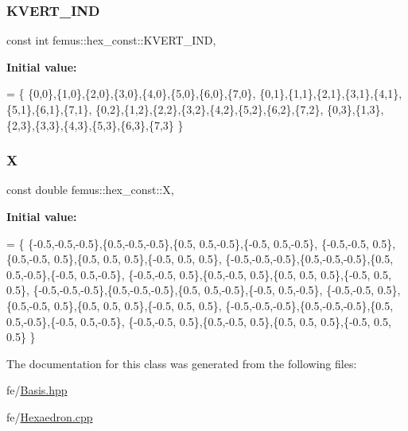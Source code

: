 \subsubsection{\texorpdfstring{K\+V\+E\+R\+T\+\_\+\+I\+ND}{KVERT\_IND}}
{\footnotesize\ttfamily const int femus\+::hex\+\_\+const\+::\+K\+V\+E\+R\+T\+\_\+\+I\+ND\hspace{0.3cm}{\ttfamily [static]}, {\ttfamily [protected]}}

{\bfseries Initial value\+:}
\begin{DoxyCode}
= \{
    \{0,0\},\{1,0\},\{2,0\},\{3,0\},\{4,0\},\{5,0\},\{6,0\},\{7,0\},
    \{0,1\},\{1,1\},\{2,1\},\{3,1\},\{4,1\},\{5,1\},\{6,1\},\{7,1\},
    \{0,2\},\{1,2\},\{2,2\},\{3,2\},\{4,2\},\{5,2\},\{6,2\},\{7,2\},
    \{0,3\},\{1,3\},\{2,3\},\{3,3\},\{4,3\},\{5,3\},\{6,3\},\{7,3\}
  \}
\end{DoxyCode}
\mbox{\label{classfemus_1_1hex__const_a5c73e5bd6411607a040bca49d6b6cb94}} 
\subsubsection{\texorpdfstring{X}{X}}
{\footnotesize\ttfamily const double femus\+::hex\+\_\+const\+::X\hspace{0.3cm}{\ttfamily [static]}, {\ttfamily [protected]}}

{\bfseries Initial value\+:}
\begin{DoxyCode}
= \{
    \{-0.5,-0.5,-0.5\},\{0.5,-0.5,-0.5\},\{0.5, 0.5,-0.5\},\{-0.5, 0.5,-0.5\},
    \{-0.5,-0.5, 0.5\},\{0.5,-0.5, 0.5\},\{0.5, 0.5, 0.5\},\{-0.5, 0.5, 0.5\},
    \{-0.5,-0.5,-0.5\},\{0.5,-0.5,-0.5\},\{0.5, 0.5,-0.5\},\{-0.5, 0.5,-0.5\},
    \{-0.5,-0.5, 0.5\},\{0.5,-0.5, 0.5\},\{0.5, 0.5, 0.5\},\{-0.5, 0.5, 0.5\},
    \{-0.5,-0.5,-0.5\},\{0.5,-0.5,-0.5\},\{0.5, 0.5,-0.5\},\{-0.5, 0.5,-0.5\},
    \{-0.5,-0.5, 0.5\},\{0.5,-0.5, 0.5\},\{0.5, 0.5, 0.5\},\{-0.5, 0.5, 0.5\},
    \{-0.5,-0.5,-0.5\},\{0.5,-0.5,-0.5\},\{0.5, 0.5,-0.5\},\{-0.5, 0.5,-0.5\},
    \{-0.5,-0.5, 0.5\},\{0.5,-0.5, 0.5\},\{0.5, 0.5, 0.5\},\{-0.5, 0.5, 0.5\}
  \}
\end{DoxyCode}


The documentation for this class was generated from the following files\+:\begin{DoxyCompactItemize}
\item 
fe/\mbox{\hyperlink{_basis_8hpp}{Basis.\+hpp}}\item 
fe/\mbox{\hyperlink{_hexaedron_8cpp}{Hexaedron.\+cpp}}\end{DoxyCompactItemize}
